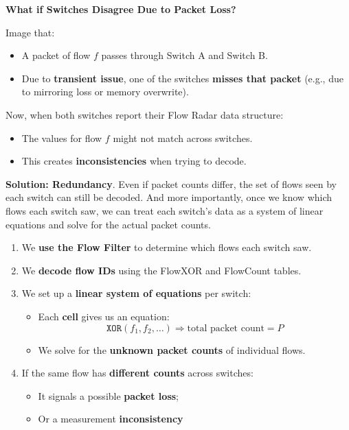 \highspace
\begin{flushleft}
    \textcolor{Red2}{ \textbf{What if Switches Disagree Due to Packet Loss?}}
\end{flushleft}
Image that:
\begin{itemize}
    \item A packet of flow $f$ passes through Switch A and Switch B.
    \item Due to \textbf{transient issue}, one of the switches \textbf{misses that packet} (e.g., due to mirroring loss or memory overwrite).
\end{itemize}
Now, when both switches report their Flow Radar data structure:
\begin{itemize}
    \item The values for flow $f$ might not match across switches.
    \item This creates \textbf{inconsistencies} when trying to decode.
\end{itemize}
\textcolor{Green3}{ \textbf{Solution: Redundancy}}. Even if packet counts differ, the set of flows seen by each switch can still be decoded. And more importantly, once we know which flows each switch saw, we can treat each switch's data as a system of linear equations and solve for the actual packet counts.
\begin{enumerate}
    \item We \textbf{use the Flow Filter} to determine which flows each switch saw.
    \item We \textbf{decode flow IDs} using the FlowXOR and FlowCount tables.
    \item We set up a \textbf{linear system of equations} per switch:
    \begin{itemize}
        \item Each \textbf{cell} gives us an equation:
        \begin{equation*}
            \texttt{XOR}\left(f_{1}, f_{2}, \dots\right) \Rightarrow \text{total packet count} = P
        \end{equation*}
        \item We solve for the \textbf{unknown packet counts} of individual flows.
    \end{itemize}
    \item If the same flow has \textbf{different counts} across switches:
    \begin{itemize}
        \item It signals a possible \textbf{packet loss};
        \item Or a measurement \textbf{inconsistency}
    \end{itemize}
\end{enumerate}